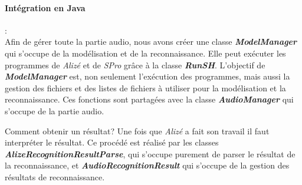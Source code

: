 \paragraph*{Intégration en Java} : \\
Afin de gérer toute la partie audio, nous avons créer une classe \textbf{\textit{ModelManager}} qui s'occupe de la modélisation et de la reconnaissance. Elle
peut exécuter les programmes de \textit{Alizé} et de \textit{SPro} grâce à la classe \textbf{\textit{RunSH}}. L'objectif de \textbf{\textit{ModelManager}}
est, non seulement l'exécution des programmes, mais aussi la gestion des fichiers et des listes de fichiers à utiliser pour la modélisation et la
reconnaissance.
Ces fonctions sont partagées avec la classe \textbf{\textit{AudioManager}} qui s'occupe de la partie audio.

Comment obtenir un résultat? Une fois que \textit{Alizé} a fait son travail il faut interpréter le résultat. Ce procédé est réalisé par les classes
\textbf{\textit{AlizeRecognitionResultParse}}, qui s'occupe purement de parser le résultat de la reconnaissance, et \textbf{\textit{AudioRecognitionResult}}
qui s'occupe de la gestion des résultats de reconnaissance.


